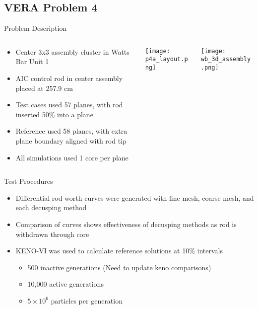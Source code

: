 \subsection{VERA Problem 4}
\begin{frame}[t]{Problem Description}
    
\begin{columns}
    \begin{column}{0.5\textwidth}
        \begin{itemize}
            \item Center 3x3 assembly cluster in Watts Bar Unit 1
            \item AIC control rod in center assembly placed at 257.9 cm
            \item Test cases used 57 planes, with rod inserted 50\% into a plane
            \item Reference used 58 planes, with extra plane boundary aligned 
            with rod tip
            \item All simulations used 1 core per plane
        \end{itemize}
    \end{column}
    \begin{column}{0.28\textwidth}
        \texttt{[image: p4a\_layout.png]}
    \end{column}
    \begin{column}{0.22\textwidth}
        \texttt{[image: wb\_3d\_assembly.png]}
\end{column}
\end{columns}
    
\end{frame}


\begin{frame}[t]{Test Procedures}
    
    \begin{itemize}
        \item Differential rod worth curves were generated with fine mesh, coarse mesh, and each decusping method
        \item Comparison of curves shows effectiveness of decusping methods as rod is withdrawn through core
        \item KENO-VI was used to calculate reference solutions at 10\% intervals
        \begin{itemize}
            \item 500 inactive generations (Need to update keno comparisons)
            \item 10,000 active generations
            \item $5\times 10^6$ particles per generation
        \end{itemize}
    \end{itemize}

\end{frame}

